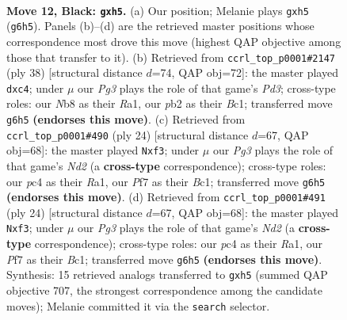 \documentclass[11pt]{article}
\begin{document}
\clearpage

\begin{figure}[p]\centering
\begin{subfigure}{0.46\textwidth}\centering
\resizebox{\linewidth}{!}{%
\newchessgame
\chessboard[
  setfen={rnbr2k1/ppp1ppbp/1n4p1/4P2P/P1P5/1B3N2/1P3PP1/RNB1K2R b KQ - 0 12},
  showmover=false,
  pgfstyle=straightmove, color=movearrow, markmove={g6-h5}
]}
\caption{}
\end{subfigure}\hfill
\begin{subfigure}{0.46\textwidth}\centering
\resizebox{\linewidth}{!}{%
\newchessgame
\chessboard[
  setfen={2r2k1r/1p1n1p2/p2b1np1/4p3/2p4p/3P1N1P/P1P1BPP1/R1BR2K1 w - - 0 20},
  showmover=false,
  pgfstyle=straightmove, color=movearrow, markmove={d3-c4}
]}
\caption{}
\end{subfigure}
\\[4pt]
\begin{subfigure}{0.46\textwidth}\centering
\resizebox{\linewidth}{!}{%
\newchessgame
\chessboard[
  setfen={r2k1b1r/ppp3pp/2n1bn2/3p4/3P4/2P1Np2/PP1N2PP/R1B1KB1R w KQ - 0 13},
  showmover=false,
  pgfstyle=straightmove, color=movearrow, markmove={d2-f3}
]}
\caption{}
\end{subfigure}\hfill
\begin{subfigure}{0.46\textwidth}\centering
\resizebox{\linewidth}{!}{%
\newchessgame
\chessboard[
  setfen={r2k1b1r/ppp3pp/2n1bn2/3p4/3P4/2P1Np2/PP1N2PP/R1B1KB1R w KQ - 0 13},
  showmover=false,
  pgfstyle=straightmove, color=movearrow, markmove={d2-f3}
]}
\caption{}
\end{subfigure}
\caption{\textbf{Move 12, Black: \texttt{gxh5}.} (a) Our position; Melanie plays \texttt{gxh5} (\texttt{g6h5}). Panels (b)--(d) are the retrieved master positions whose correspondence most drove this move (highest QAP objective among those that transfer to it). (b) Retrieved from \texttt{ccrl\_top\_p0001\#2147} (ply 38) [structural distance $d$=74, QAP obj=72]: the master played \texttt{dxc4}; under $\mu$ our \emph{Pg3} plays the role of that game's \emph{Pd3}; cross-type roles: our \emph{N}b8 as their \emph{R}a1, our \emph{p}b2 as their \emph{B}c1; transferred move \texttt{g6h5} \textbf{(endorses this move)}. (c) Retrieved from \texttt{ccrl\_top\_p0001\#490} (ply 24) [structural distance $d$=67, QAP obj=68]: the master played \texttt{Nxf3}; under $\mu$ our \emph{Pg3} plays the role of that game's \emph{Nd2} (a \textbf{cross-type} correspondence); cross-type roles: our \emph{p}c4 as their \emph{R}a1, our \emph{P}f7 as their \emph{B}c1; transferred move \texttt{g6h5} \textbf{(endorses this move)}. (d) Retrieved from \texttt{ccrl\_top\_p0001\#491} (ply 24) [structural distance $d$=67, QAP obj=68]: the master played \texttt{Nxf3}; under $\mu$ our \emph{Pg3} plays the role of that game's \emph{Nd2} (a \textbf{cross-type} correspondence); cross-type roles: our \emph{p}c4 as their \emph{R}a1, our \emph{P}f7 as their \emph{B}c1; transferred move \texttt{g6h5} \textbf{(endorses this move)}. Synthesis: 15 retrieved analogs transferred to \texttt{gxh5} (summed QAP objective 707, the strongest correspondence among the candidate moves); Melanie committed it via the \texttt{search} selector.}
\label{fig:thought-m23}
\end{figure}
\end{document}
